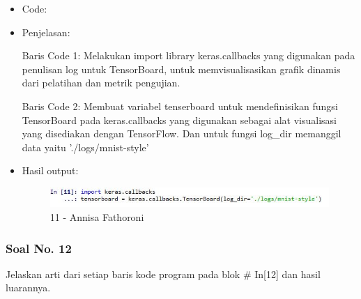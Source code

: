 \begin{itemize}
\item Code:


\item Penjelasan:

Baris Code 1:  Melakukan import library keras.callbacks yang digunakan pada penulisan log untuk TensorBoard, untuk memvisualisasikan grafik dinamis dari pelatihan dan metrik pengujian.

Baris Code 2: Membuat variabel tenserboard untuk mendefinisikan fungsi TensorBoard pada keras.callbacks yang digunakan sebagai alat visualisasi yang disediakan dengan TensorFlow. Dan untuk fungsi log\_dir memanggil data yaitu './logs/mnist-style'

\item Hasil output:

\begin{figure}[!hbtp]
\centering
\includegraphics[scale=0.7]{figures/Chapter 7/1164067/Praktek/Chapter7AnnisaFathoroni11.jpg}
\caption{11 - Annisa Fathoroni}
\label{11 - Annisa Fathoroni}
\end{figure}

\end{itemize}

\subsubsection{Soal No. 12}
Jelaskan arti dari setiap baris kode program pada blok \# In[12] dan hasil luarannya.

